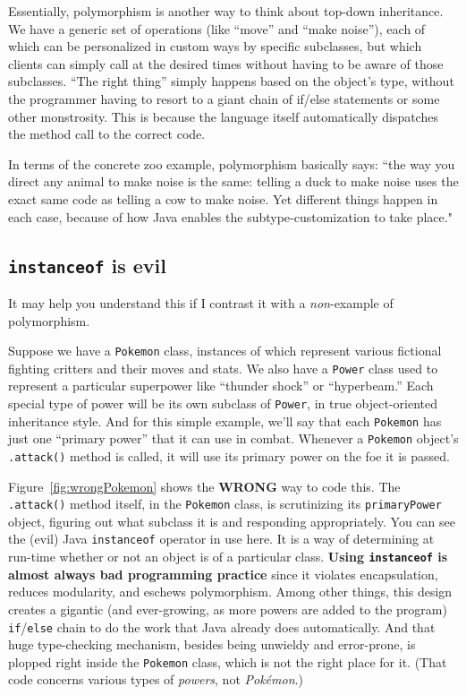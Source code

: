 Essentially, polymorphism is another way to think about top-down inheritance.
We have a generic set of operations (like ``move'' and ``make noise''), each
of which can be personalized in custom ways by specific subclasses, but which
clients can simply call at the desired times without having to be aware of
those subclasses. ``The right thing'' simply happens based on the object's
type, without the programmer having to resort to a giant chain of if/else
statements or some other monstrosity. This is because the language itself
automatically dispatches the method call to the correct code.

In terms of the concrete zoo example, polymorphism basically says: ``the way
you direct any animal to make noise is the same: telling a duck to make noise
uses the exact same code as telling a cow to make noise. Yet different things
happen in each case, because of how Java enables the subtype-customization to
take place."

\subsection{\texttt{instanceof} is evil}

It may help you understand this if I contrast it with a \textit{non}-example
of polymorphism.

Suppose we have a \texttt{Pokemon} class, instances of which represent various
fictional fighting critters and their moves and stats. We also have a
\texttt{Power} class used to represent a particular superpower like ``thunder
shock'' or ``hyperbeam.'' Each special type of power will be its own subclass
of \texttt{Power}, in true object-oriented inheritance style. And for this
simple example, we'll say that each \texttt{Pokemon} has just one ``primary
power'' that it can use in combat. Whenever a \texttt{Pokemon} object's
\texttt{.attack()} method is called, it will use its primary power on the foe
it is passed.

Figure~\ref{fig:wrongPokemon} shows the \textbf{WRONG} way to code this. The
\texttt{.attack()} method itself, in the \texttt{Pokemon} class, is
scrutinizing its \texttt{primaryPower} object, figuring out what subclass it
is and responding appropriately. You can see the (evil) Java
\texttt{instanceof} operator in use here. It is a way of determining at
run-time whether or not an object is of a particular class. \textbf{Using
\texttt{instanceof} is almost always bad programming practice} since it
violates encapsulation, reduces modularity, and eschews polymorphism.
Among other things, this design creates a gigantic (and ever-growing, as more
powers are added to the program) \texttt{if}/\texttt{else} chain to do the
work that Java already does automatically. And that huge type-checking
mechanism, besides being unwieldy and error-prone, is plopped right inside the
\texttt{Pokemon} class, which is not the right place for it. (That code
concerns various types of \textit{powers}, not \textit{Pok\'{e}mon}.)

